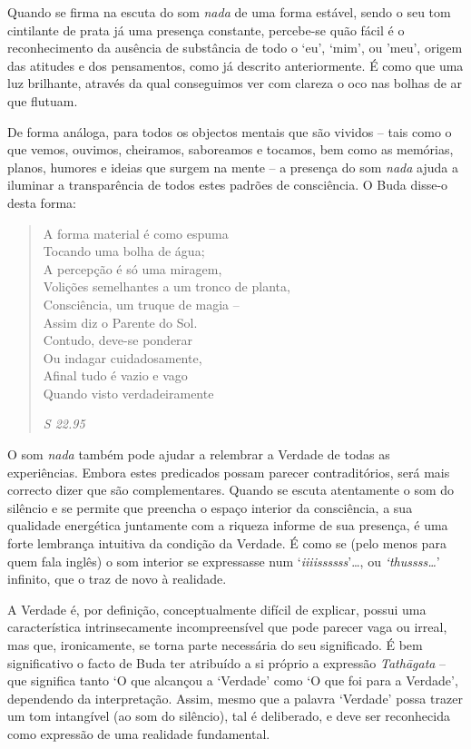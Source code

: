 Quando se firma na escuta do som \emph{nada} de uma forma estável, sendo
o seu tom cintilante de prata já uma presença constante, percebe-se quão
fácil é o reconhecimento da ausência de substância de todo o `eu',
`mim', ou 'meu', origem das atitudes e dos pensamentos, como já descrito
anteriormente. É como que uma luz brilhante, através da qual conseguimos
ver com clareza o oco nas bolhas de ar que flutuam.

De forma análoga, para todos os objectos mentais que são vividos -- tais
como o que vemos, ouvimos, cheiramos, saboreamos e tocamos, bem como as
memórias, planos, humores e ideias que surgem na mente -- a presença do
som \emph{nada} ajuda a iluminar a transparência de todos estes padrões
de consciência. O Buda disse-o desta forma:

\begin{quote}
A forma material é como espuma\\
Tocando uma bolha de água;\\
A percepção é só uma miragem,\\
Volições semelhantes a um tronco de planta,\\
Consciência, um truque de magia --\\
Assim diz o Parente do Sol.\\
Contudo, deve-se ponderar\\
Ou indagar cuidadosamente,\\
Afinal tudo é vazio e vago\\
Quando visto verdadeiramente

\emph{S 22.95}
\end{quote}

O som \emph{nada} também pode ajudar a relembrar a Verdade de todas as
experiências. Embora estes predicados possam parecer contraditórios,
será mais correcto dizer que são complementares. Quando se escuta
atentamente o som do silêncio e se permite que preencha o espaço
interior da consciência, a sua qualidade energética juntamente com a
riqueza informe de sua presença, é uma forte lembrança intuitiva da
condição da Verdade. É como se (pelo menos para quem fala inglês) o som
interior se expressasse num `\emph{iiiissssss}'\ldots{}, ou
\emph{`thussss\ldots{}}' infinito, que o traz de novo à realidade.

A Verdade é, por definição, conceptualmente difícil de explicar, possui
uma característica intrinsecamente incompreensível que pode parecer vaga
ou irreal, mas que, ironicamente, se torna parte necessária do seu
significado. É bem significativo o facto de Buda ter atribuído a si
próprio a expressão \emph{Tathāgata} -- que significa tanto `O que
alcançou a `Verdade' como `O que foi para a Verdade', dependendo da
interpretação. Assim, mesmo que a palavra `Verdade' possa trazer um tom
intangível (ao som do silêncio), tal é deliberado, e deve ser
reconhecida como expressão de uma realidade fundamental.

